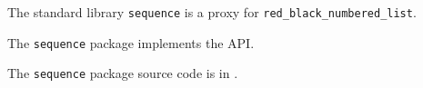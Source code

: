 

The standard library {\tt sequence} is a proxy for {\tt red\_black\_numbered\_list}.

The {\tt sequence} package implements the  API.

The {\tt sequence} package source code is in .
